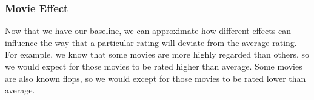 \documentclass[
]{article}
\newenvironment{Shaded}{\begin{snugshade}}{\end{snugshade}}
\newcommand{\DataTypeTok}[1]{\textcolor[rgb]{0.13,0.29,0.53}{#1}}
\newcommand{\DecValTok}[1]{\textcolor[rgb]{0.00,0.00,0.81}{#1}}
\newcommand{\KeywordTok}[1]{\textcolor[rgb]{0.13,0.29,0.53}{\textbf{#1}}}
\newcommand{\NormalTok}[1]{#1}
\newcommand{\OperatorTok}[1]{\textcolor[rgb]{0.81,0.36,0.00}{\textbf{#1}}}
\newcommand{\StringTok}[1]{\textcolor[rgb]{0.31,0.60,0.02}{#1}}
\begin{document}
\hypertarget{movie-effect}{%
\subsubsection{Movie Effect}\label{movie-effect}}

Now that we have our baseline, we can approximate how different effects
can influence the way that a particular rating will deviate from the
average rating. For example, we know that some movies are more highly
regarded than others, so we would expect for those movies to be rated
higher than average. Some movies are also known flops, so we would
except for those movies to be rated lower than average.

\begin{Shaded}
\end{Shaded}
\end{document}
